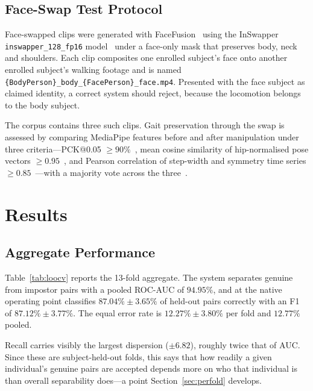 \documentclass[journal]{IEEEtran}
\begin{document}
\subsection{Face-Swap Test Protocol}

Face-swapped clips were generated with FaceFusion~\cite{facefusion} using the
InSwapper \texttt{inswapper\_128\_fp16} model~\cite{insightface} under a
face-only mask that preserves body, neck and shoulders. Each clip composites
one enrolled subject's face onto another enrolled subject's walking footage and
is named
\texttt{\{BodyPerson\}\_body\_\{FacePerson\}\_face.mp4}. Presented with the
face subject as claimed identity, a correct system should reject, because the
locomotion belongs to the body subject.

The corpus contains three such clips. Gait preservation through the swap is
assessed by comparing MediaPipe features before and after manipulation under
three criteria---PCK@0.05 $\ge 90\%$~\cite{andriluka_mpii}, mean cosine
similarity of hip-normalised pose vectors $\ge 0.95$~\cite{liao_gait}, and
Pearson correlation of step-width and symmetry time series $\ge
0.85$~\cite{menz}---with a majority vote across the three~\cite{taha_metrics}.

\section{Results}
\label{sec:results}

\subsection{Aggregate Performance}

Table~\ref{tab:loocv} reports the 13-fold aggregate. The system separates
genuine from impostor pairs with a pooled ROC-AUC of $94.95\%$, and at the
native operating point classifies $87.04\% \pm 3.65\%$ of held-out pairs
correctly with an F1 of $87.12\% \pm 3.77\%$. The equal error rate is
$12.27\% \pm 3.80\%$ per fold and $12.77\%$ pooled.

Recall carries visibly the largest dispersion ($\pm 6.82$), roughly twice that
of AUC. Since these are subject-held-out folds, this says that how readily a
given individual's genuine pairs are accepted depends more on who that
individual is than overall separability does---a point Section~\ref{sec:perfold}
develops.
\end{document}
